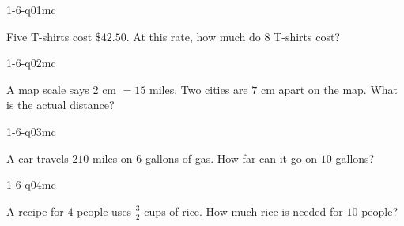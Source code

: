 

\begin{practiceQuestion}{1-6-q01}{mc}
\begin{questionText}
Five T-shirts cost $\$42.50$. At this rate, how much do $8$ T-shirts cost?
\end{questionText}
\end{practiceQuestion}

\begin{practiceQuestion}{1-6-q02}{mc}
\begin{questionText}
A map scale says $2$ cm $= 15$ miles. Two cities are $7$ cm apart on the map. What is the actual distance?
\end{questionText}
\end{practiceQuestion}

\begin{practiceQuestion}{1-6-q03}{mc}
\begin{questionText}
A car travels $210$ miles on $6$ gallons of gas. How far can it go on $10$ gallons?
\end{questionText}
\end{practiceQuestion}

\begin{practiceQuestion}{1-6-q04}{mc}
\begin{questionText}
A recipe for $4$ people uses $\frac{3}{2}$ cups of rice. How much rice is needed for $10$ people?
\end{questionText}
\end{practiceQuestion}


